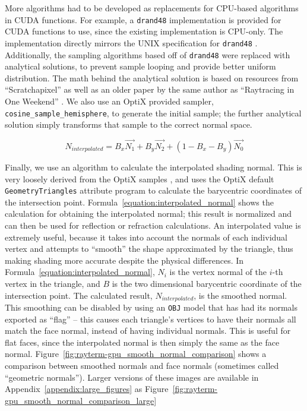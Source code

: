 More algorithms had to be developed as replacements for CPU-based algorithms in CUDA functions.
For example, a \texttt{drand48} implementation is provided for CUDA functions to use, since the existing implementation is CPU-only.
The implementation directly mirrors the UNIX specification for \texttt{drand48} \cite{drand48UNIX}.
Additionally, the sampling algorithms based off of \texttt{drand48} were replaced with analytical solutions, to prevent sample looping and provide better uniform distribution.
The math behind the analytical solution is based on resources from ``Scratchapixel'' as well as an older paper by the same author as ``Raytracing in One Weekend'' \cite{prunier2017global, shirley1997map}.
We also use an OptiX provided sampler, \texttt{cosine\_sample\_hemisphere}, to generate the initial sample; the further analytical solution simply transforms that sample to the correct normal space.

\begin{equation}
  \label{equation:interpolated_normal}
  N_{interpolated} = B_{x} \vec{N_{1}} + B_{y} \vec{N_{2}} + (1 - B_{x} - B_{y}) \vec{N_{0}}
\end{equation}

Finally, we use an algorithm to calculate the interpolated shading normal.
This is very loosely derived from the OptiX samples \cite{optixsamples}, and uses the OptiX default \texttt{GeometryTriangles} attribute program to calculate the barycentric coordinates of the intersection point.
Formula~\ref{equation:interpolated_normal} shows the calculation for obtaining the interpolated normal; this result is normalized and can then be used for reflection or refraction calculations.
An interpolated value is extremely useful, because it takes into account the normals of each individual vertex and attempts to ``smooth'' the shape approximated by the triangle, thus making shading more accurate despite the physical differences.
In Formula~\ref{equation:interpolated_normal}, $N_{i}$ is the vertex normal of the $i$-th vertex in the triangle, and $B$ is the two dimensional barycentric coordinate of the intersection point.
The calculated result, $N_{interpolated}$, is the smoothed normal.
This smoothing can be disabled by using an \texttt{OBJ} model that has had its normals exported as ``flag'' -- this causes each triangle's vertices to have their normals all match the face normal, instead of having individual normals.
This is useful for flat faces, since the interpolated normal is then simply the same as the face normal.
Figure~\ref{fig:rayterm-gpu_smooth_normal_comparison} shows a comparison between smoothed normals and face normals (sometimes called ``geometric normals'').
Larger versions of these images are available in Appendix~\ref{appendix:large_figures} as Figure~\ref{fig:rayterm-gpu_smooth_normal_comparison_large}

